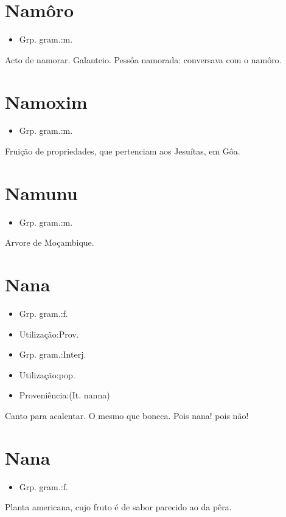 \section{Namôro}
\begin{itemize}
\item {Grp. gram.:m.}
\end{itemize}
Acto de namorar.
Galanteio.
Pessôa namorada: \textunderscore conversava com o namôro\textunderscore .
\section{Namoxim}
\begin{itemize}
\item {Grp. gram.:m.}
\end{itemize}
Fruição de propriedades, que pertenciam aos Jesuítas, em Gôa.
\section{Namunu}
\begin{itemize}
\item {Grp. gram.:m.}
\end{itemize}
Arvore de Moçambique.
\section{Nana}
\begin{itemize}
\item {Grp. gram.:f.}
\end{itemize}
\begin{itemize}
\item {Utilização:Prov.}
\end{itemize}
\begin{itemize}
\item {Grp. gram.:Interj.}
\end{itemize}
\begin{itemize}
\item {Utilização:pop.}
\end{itemize}
\begin{itemize}
\item {Proveniência:(It. \textunderscore nanna\textunderscore )}
\end{itemize}
Canto para acalentar.
O mesmo que \textunderscore boneca\textunderscore .
\textunderscore Pois nana\textunderscore ! pois não!
\section{Nana}
\begin{itemize}
\item {Grp. gram.:f.}
\end{itemize}
Planta americana, cujo fruto é de sabor parecido ao da pêra.
